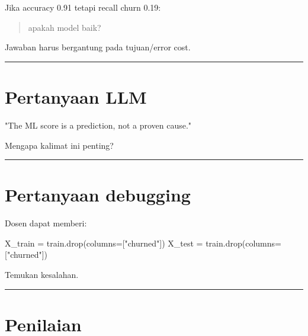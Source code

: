 \documentclass[
  indonesian,
  letterpaper,
  DIV=11,
  numbers=noendperiod]{scrreprt}
\newenvironment{Shaded}{\begin{snugshade}}{\end{snugshade}}
\newcommand{\NormalTok}[1]{\textcolor[rgb]{0.00,0.23,0.31}{#1}}
\newcommand{\OperatorTok}[1]{\textcolor[rgb]{0.37,0.37,0.37}{#1}}
\newcommand{\StringTok}[1]{\textcolor[rgb]{0.13,0.47,0.30}{#1}}
\begin{document}
Jika accuracy 0.91 tetapi recall churn 0.19:

\begin{quote}
apakah model baik?
\end{quote}

Jawaban harus bergantung pada tujuan/error cost.

\begin{center}\rule{0.5\linewidth}{0.5pt}\end{center}

\section{Pertanyaan LLM}\label{pertanyaan-llm}

\begin{Shaded}
\begin{Highlighting}[]
\NormalTok{"The ML score is a prediction, not a proven cause."}
\end{Highlighting}
\end{Shaded}

Mengapa kalimat ini penting?

\begin{center}\rule{0.5\linewidth}{0.5pt}\end{center}

\section{Pertanyaan debugging}\label{pertanyaan-debugging}

Dosen dapat memberi:

\begin{Shaded}
\begin{Highlighting}[]
\NormalTok{X\_train }\OperatorTok{=}\NormalTok{ train.drop(columns}\OperatorTok{=}\NormalTok{[}\StringTok{"churned"}\NormalTok{])}
\NormalTok{X\_test }\OperatorTok{=}\NormalTok{ train.drop(columns}\OperatorTok{=}\NormalTok{[}\StringTok{"churned"}\NormalTok{])}
\end{Highlighting}
\end{Shaded}

Temukan kesalahan.

\begin{center}\rule{0.5\linewidth}{0.5pt}\end{center}

\section{Penilaian}\label{penilaian}
\end{document}

